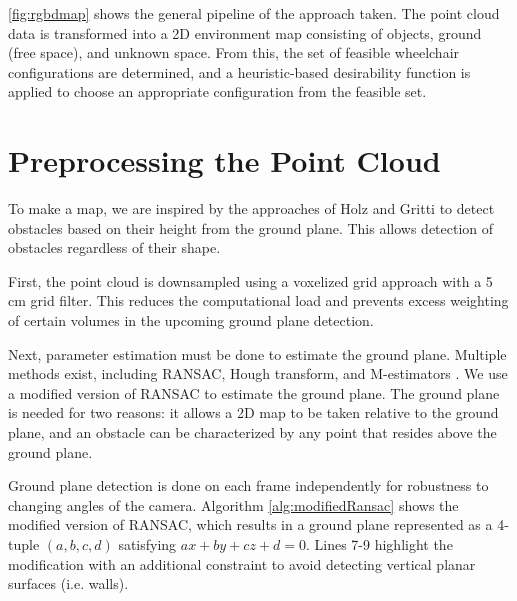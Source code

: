 \autoref{fig:rgbdmap} shows the general pipeline of the approach taken. The
point cloud data is transformed into a 2D environment map consisting of objects,
ground (free space), and unknown space. From this, the set of feasible
wheelchair configurations are determined, and a heuristic-based desirability
function is applied to choose an appropriate configuration from the feasible set.





\section{Preprocessing the Point Cloud}
\label{sec:processingPointCloud}
To make a map, we are inspired by the approaches of Holz \cite{holz2013towards}
and Gritti \cite{gritti2014kinect} to detect obstacles based on their height
from the ground plane. This allows detection of obstacles regardless of
their shape.


First, the point cloud is downsampled using a voxelized grid approach with a 5 cm
grid filter. This reduces the computational load and prevents excess weighting of
certain volumes in the upcoming ground plane detection.

Next, parameter estimation must be done to estimate the ground plane. Multiple methods
exist, including RANSAC, Hough transform, and M-estimators
\cite{holz2013towards}.
We use a modified version of RANSAC to estimate the ground plane. The
ground plane is needed for two reasons:
it allows a 2D map to be taken relative to the ground plane, and an obstacle can
be characterized by any point that resides above the ground plane.

Ground plane detection is done on each frame independently for robustness to
changing angles of the camera.
Algorithm \autoref{alg:modifiedRansac} shows the modified version of RANSAC,
which results in a ground plane represented as a 4-tuple $(a,b,c,d)$ satisfying
$ax + by + cz + d = 0$. Lines 7-9 highlight the modification with an additional
constraint to avoid detecting vertical planar surfaces (i.e. walls).


